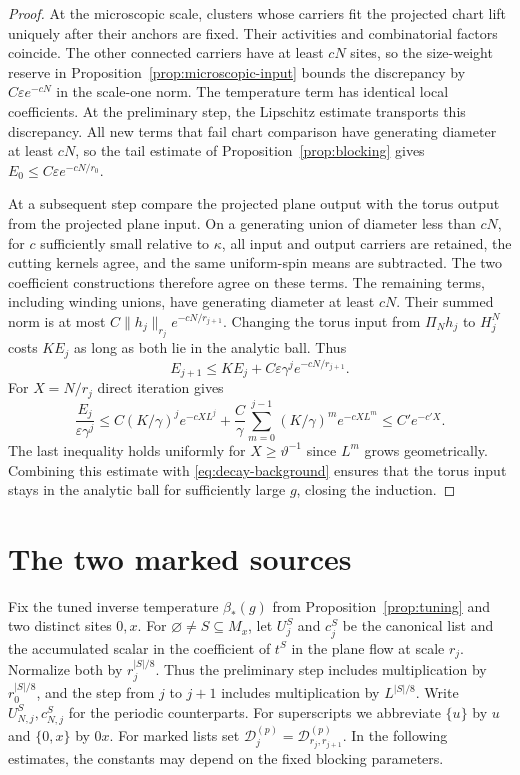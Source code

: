 \documentclass[11pt]{article}
\theoremstyle{definition}
\begin{document}
\begin{proof}
At the microscopic scale, clusters whose carriers fit the projected
chart lift uniquely after their anchors are fixed. Their activities
and combinatorial factors coincide. The other connected carriers
have at least \(cN\) sites, so the size-weight reserve in
Proposition~\ref{prop:microscopic-input} bounds the discrepancy by
\(C\varepsilon e^{-cN}\) in the scale-one norm.
The temperature term has identical local coefficients. At the
preliminary step, the Lipschitz estimate transports this discrepancy.
All new terms that fail chart comparison have generating diameter
at least \(cN\), so the tail estimate of Proposition~\ref{prop:blocking}
gives \(E_0\le C\varepsilon e^{-cN/r_0}\).

At a subsequent step compare the projected plane output with the
torus output from the projected plane input. On a generating union
of diameter less than \(cN\), for \(c\) sufficiently small relative
to \(\kappa\), all input and output carriers are retained, the cutting
kernels agree, and the same uniform-spin means are subtracted.
The two coefficient constructions therefore agree on these terms.
The remaining terms, including winding unions, have generating
diameter at least \(cN\). Their summed norm is at most
\(C\|h_j\|_{r_j}e^{-cN/r_{j+1}}\). Changing the torus input
from \(\Pi_Nh_j\) to \(H_j^N\) costs \(K E_j\) as long as both lie
in the analytic ball. Thus
\[
 E_{j+1}\le K E_j+C\varepsilon\gamma^j e^{-cN/r_{j+1}} .
\]
For \(X=N/r_j\) direct iteration gives
\[
 \frac{E_j}{\varepsilon\gamma^j}
 \le C(K/\gamma)^j e^{-cX L^j}
       +\frac C\gamma\sum_{m=0}^{j-1}(K/\gamma)^m e^{-cX L^m}
 \le C' e^{-c' X}.
\]
The last inequality holds uniformly for \(X\ge\vartheta^{-1}\) since
\(L^m\) grows geometrically. Combining this estimate with
\eqref{eq:decay-background} ensures that the torus input stays in
the analytic ball for sufficiently large \(g\), closing the induction.
\end{proof}

\section{The two marked sources}
\label{sec:two-sources}

Fix the tuned inverse temperature \(\beta_*(g)\) from
Proposition~\ref{prop:tuning} and two distinct sites \(0,x\).
For \(\varnothing\ne S\subseteq M_x\), let \(U_j^S\)
and \(c_j^S\) be the canonical list and the accumulated scalar
in the coefficient of \(t^S\) in the plane flow at scale \(r_j\).
Normalize both by \(r_j^{|S|/8}\).
Thus the preliminary step includes multiplication by
\(r_0^{|S|/8}\), and the step from \(j\) to \(j+1\) includes
multiplication by \(L^{|S|/8}\).
Write \(U_{N,j}^S,c_{N,j}^S\) for the periodic counterparts.
For superscripts we abbreviate \(\{u\}\) by \(u\) and
\(\{0,x\}\) by \(0x\). For marked lists set
\(\mathcal D_j^{(p)}=\mathcal D_{r_j,r_{j+1}}^{(p)}\).
In the following estimates, the constants may depend on the
fixed blocking parameters.
\end{document}
